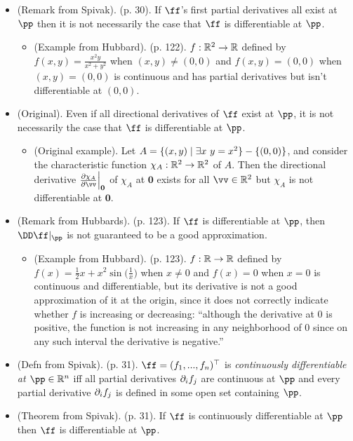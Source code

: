 \begin{itemize}
    \item (Remark from Spivak). (p. 30). If $\ff$'s first partial derivatives all exist at $\pp$ then it is not necessarily the case that $\ff$ is differentiable at $\pp$.
    \begin{itemize}
        \item (Example from Hubbard). (p. 122). $f:\mathbb{R}^2 \rightarrow \mathbb{R}$ defined by $f(x, y) = \frac{x^2 y}{x^2 + y^2}$ when $(x, y) \neq (0, 0)$ and $f(x, y) = (0, 0)$ when $(x, y) = (0, 0)$ is continuous and has partial derivatives but isn't differentiable at $(0, 0)$.
    \end{itemize}
    \item (Original). Even if all directional derivatives of $\ff$ exist at $\pp$, it is not necessarily the case that $\ff$ is differentiable at $\pp$.
    \begin{itemize}
        \item (Original example). Let $A = \{ (x, y) \mid \exists x \text{ } y = x^2 \} - \{(0, 0)\}$, and consider the characteristic function $\chi_A:\mathbb{R}^2 \rightarrow \mathbb{R}^2$ of $A$. Then the directional derivative $\frac{\pd \chi_A}{\pd \vv}\Big|_{\mathbf{0}}$ of $\chi_A$ at $\mathbf{0}$ exists for all $\vv \in \R^2$ but $\chi_A$ is not differentiable at $\mathbf{0}$.
    \end{itemize}
    \item (Remark from Hubbards). (p. 123). If $\ff$ is differentiable at $\pp$, then $\DD \ff|_\pp$ is not guaranteed to be a good approximation.
    \begin{itemize}
        \item (Example from Hubbard). (p. 123). $f:\mathbb{R} \rightarrow \mathbb{R}$ defined by $f(x) = \frac{1}{2}x + x^2 \sin\Big(\frac{1}{x}\Big)$ when $x \neq 0$ and $f(x) = 0$ when $x = 0$ is continuous and differentiable, but its derivative is not a good approximation of it at the origin, since it does not correctly indicate whether $f$ is increasing or decreasing: ``although the derivative at $0$ is positive, the function is not increasing in any neighborhood of $0$ since on any such interval the derivative is negative.''
    \end{itemize}
    \item (Defn from Spivak). (p. 31). $\ff = (f_1, ..., f_n)^\top$ is \textit{continuously differentiable at $\pp \in \R^n$} iff all partial derivatives $\partial_i f_j$ are continuous at $\pp$ and every partial derivative $\partial_i f_j$ is defined in some open set  containing $\pp$.
    \item (Theorem from Spivak). (p. 31). If $\ff$ is continuously differentiable at $\pp$ then $\ff$ is differentiable at $\pp$.
\end{itemize}   

